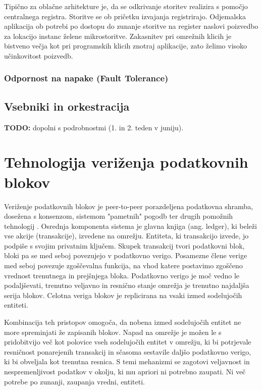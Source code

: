 \documentclass[a4paper, 12pt]{book}
\begin{document}
Tipično za oblačne arhitekture je, da se odkrivanje storitev realizira s pomočjo centralnega registra.
Storitve se ob pričetku izvajanja registrirajo.
Odjemalska aplikacija ob potrebi po dostopu do zunanje storitve na register naslovi poizvedbo za lokacijo instanc želene mikrostoritve.
Zakasnitev pri omrežnih klicih je bistveno večja kot pri programskih klicih znotraj aplikacije, zato želimo visoko učinkovitost poizvedb. \cite{serviceDiscovery, maldip}

\subsection{Odpornost na napake (Fault Tolerance)}

\section{Vsebniki in orkestracija}

\textbf{TODO:} dopolni s podrobnostmi (1. in 2. teden v juniju).


\chapter{Tehnologija veriženja podatkovnih blokov}
\label{ch2}

Veriženje podatkovnih blokov je peer-to-peer porazdeljena podatkovna shramba, dosežena s konsenzom, sistemom "pametnih" pogodb ter drugih pomožnih tehnologij \cite{hyperledgerWeb}. Osrednja komponenta sistema je glavna knjiga (ang. ledger), ki beleži vse akcije (transakcije), izvedene na omrežju. \cite{hyperledgerDocs}
Entiteta, ki transakcijo izvede, jo podpiše s svojim privatnim ključem.
Skupek transakcij tvori podatkovni blok, bloki pa se med seboj povezujejo v podatkovno verigo.
Posamezne člene verige med seboj povezuje zgoščevalna funkcija, na vhod katere postavimo zgoščeno vrednost trenutnega in prejšnjega bloka.
Podatkovno verigo je moč vedno le podaljševati, trenutno veljavno in resnično stanje omrežja je trenutno najdaljša serija blokov.
Celotna veriga blokov je replicirana na vsaki izmed sodelujočih entiteti.

Kombinacija teh pristopov omogoča, da nobena izmed sodelujočih entitet ne more spreminjati že zapisanih blokov.
Napad na omrežje je možen le s pridobitvijo več kot polovice vseh sodelujočih entitet v omrežju, ki bi potrjevale resničnost ponarejenih transakcij in sčasoma sestavile daljšo podatkovno verigo, ki bi obveljala kot trenutna resnica.
S temi mehanizmi se zagotovi veljavnost in nespremenljivost podatkov v okolju, ki mu apriori ni potrebno zaupati.
Ni več potrebe po zunanji, zaupanja vredni, entiteti.
\end{document}

